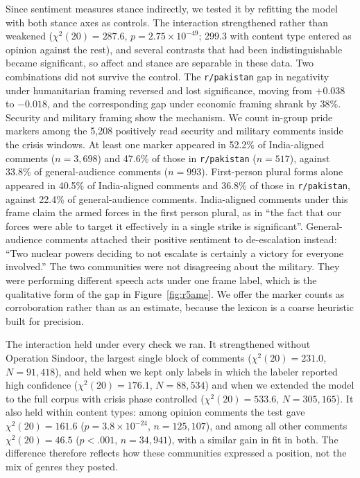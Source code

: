 Since sentiment measures stance indirectly, we tested it by refitting the model with both stance axes as controls. The interaction strengthened rather than weakened ($\chi^2(20) = 287.6$, $p = 2.75 \times 10^{-49}$; 299.3 with content type entered as opinion against the rest), and several contrasts that had been indistinguishable became significant, so affect and stance are separable in these data. Two combinations did not survive the control. The \texttt{r/pakistan} gap in negativity under humanitarian framing reversed and lost significance, moving from $+0.038$ to $-0.018$, and the corresponding gap under economic framing shrank by 38\%. Security and military framing show the mechanism. We count in-group pride markers among the 5,208 positively read security and military comments inside the crisis windows. At least one marker appeared in 52.2\% of India-aligned comments ($n = 3{,}698$) and 47.6\% of those in \texttt{r/pakistan} ($n = 517$), against 33.8\% of general-audience comments ($n = 993$). First-person plural forms alone appeared in 40.5\% of India-aligned comments and 36.8\% of those in \texttt{r/pakistan}, against 22.4\% of general-audience comments. India-aligned comments under this frame claim the armed forces in the first person plural, as in ``the fact that our forces were able to target it effectively in a single strike is significant''. General-audience comments attached their positive sentiment to de-escalation instead: ``Two nuclear powers deciding to not escalate is certainly a victory for everyone involved.'' The two communities were not disagreeing about the military. They were performing different speech acts under one frame label, which is the qualitative form of the gap in Figure~\ref{fig:r5ame}. We offer the marker counts as corroboration rather than as an estimate, because the lexicon is a coarse heuristic built for precision.

The interaction held under every check we ran. It strengthened without Operation Sindoor, the largest single block of comments ($\chi^2(20) = 231.0$,
$N = 91{,}418$), and held when we kept only labels in which the labeler reported high confidence ($\chi^2(20) = 176.1$, $N = 88{,}534$) and when we extended the model to the full corpus with crisis phase controlled ($\chi^2(20) = 533.6$, $N = 305{,}165$). It also held within content types: among opinion comments the test gave $\chi^2(20) = 161.6$ ($p = 3.8 \times 10^{-24}$, $n = 125{,}107$), and among all other comments $\chi^2(20) = 46.5$ ($p < .001$, $n = 34{,}941$), with a similar gain in fit in both. The difference therefore reflects how these communities expressed a position, not the mix of genres they posted.

